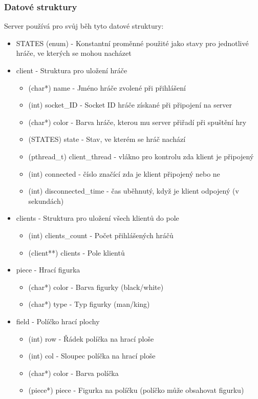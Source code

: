 \documentclass[12pt, a4paper]{article}
\begin{document}
\subsubsection{Datové struktury}
\label{Server_Datové_struktury}
Server používá pro svůj běh tyto datové struktury:
\begin{itemize}
\item STATES (enum) - Konstantní proměnné použité jako stavy pro jednotlivé hráče, ve kterých se mohou nacházet
\item client - Struktura pro uložení hráče
	\begin{itemize}
	\item (char*) name - Jméno hráče zvolené při přihlášení
	\item (int) socket\_ID - Socket ID hráče získané při připojení na server
	\item (char*) color - Barva hráče, kterou mu server přiřadí při spuštění hry
	\item (STATES) state - Stav, ve kterém se hráč nachází
	\item (pthread\_t) client\_thread - vlákno pro kontrolu zda klient je připojený
	\item (int) connected - číslo značící zda je klient připojený nebo ne
	\item (int) disconnected\_time - čas uběhnutý, když je klient odpojený (v sekundách) 
	\end{itemize}
\item clients - Struktura pro uložení všech klientů do pole
	\begin{itemize}
	\item (int) clients\_count - Počet přihlášených hráčů
	\item (client**) clients - Pole klientů
	\end{itemize}	 
\item piece - Hrací figurka
	\begin{itemize}
	\item (char*) color - Barva figurky (black/white)
	\item (char*) type - Typ figurky (man/king)
	\end{itemize}	 
\item field - Políčko hrací plochy
	\begin{itemize}
	\item (int) row - Řádek políčka na hrací ploše
	\item (int) col - Sloupec políčka na hrací ploše
	\item (char*) color - Barva políčka
	\item (piece*) piece - Figurka na políčku (políčko může obsahovat figurku)

\end{itemize}
\end{itemize}
\end{document}
